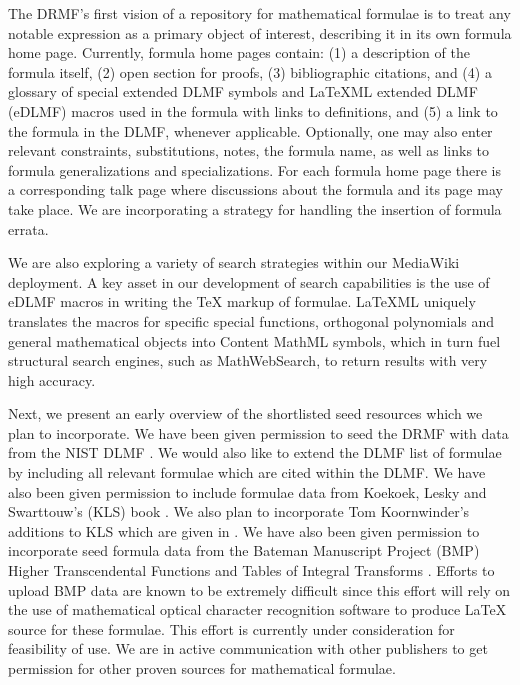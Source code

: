 \documentclass{easychair}
\begin{document}
The DRMF's first vision of a repository for mathematical formulae is to treat any 
notable expression as a primary object of interest, describing it in its 
own formula home page. Currently, formula home pages contain: (1) a description of 
the formula itself, (2) open section for proofs, (3) bibliographic citations, 
and (4) a glossary of special extended DLMF symbols and \LaTeX ML extended DLMF 
(eDLMF) macros used in the formula with links to 
definitions, and (5) a link to the formula in the DLMF, whenever applicable.  
Optionally, one may also enter relevant constraints, 
substitutions, notes, the formula name, as well as links to formula generalizations 
and specializations.  For each formula home page there is a corresponding talk page 
where discussions about the formula and its page may take place. We are 
incorporating a strategy for handling the insertion of formula errata.

We are also exploring a variety of search strategies within our MediaWiki
deployment. A key asset in our development of search capabilities is the use of 
eDLMF macros in writing the \TeX\,\,markup of formulae. \LaTeX ML uniquely translates the 
macros for specific special functions, orthogonal polynomials and general 
mathematical objects into Content MathML symbols, which in turn fuel structural 
search engines, such as MathWebSearch, to return results with very high accuracy.

Next, we present an early overview of the shortlisted seed resources which we plan 
to incorporate. We have been given permission to seed the DRMF with data from the 
NIST DLMF \cite{NIST}.  We would also like to extend the DLMF list of formulae by
including all relevant formulae which are cited within the DLMF.  We have also been
given permission to include formulae data from Koekoek, Lesky and Swarttouw's (KLS) 
book \cite{Koekoeketal}.  We also plan to incorporate Tom Koornwinder's 
additions to KLS which are given in \cite{KoornwinderKLSadd}.
We have also been given permission to incorporate seed formula data from the
Bateman Manuscript Project (BMP) Higher Transcendental Functions and Tables 
of Integral Transforms \cite{ErdelyiHTF,ErdelyiTIT}.  Efforts to 
upload BMP data are known to be extremely difficult since this effort will rely 
on the use of mathematical optical character recognition software to produce 
\LaTeX\,\,source for these formulae. This effort is currently under consideration
for feasibility of use.
We are in active communication with other publishers to get permission for other 
proven sources for mathematical formulae.  
\end{document}
